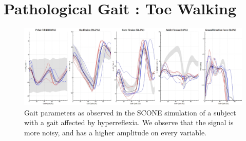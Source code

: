 \documentclass[11pt]{article}
\begin{document}
\section{Pathological Gait : Toe Walking}

\begin{figure}[h!]
    \centering
    \includegraphics[width=\textwidth]{screens/toe_walk_gait.png}
    \caption{Gait parameters as observed in the SCONE simulation of a subject with a gait affected by hyperreflexia. We observe that the signal is more noisy, and has a higher amplitude on every variable. }
    \label{toe_gait}
\end{figure}
\end{document}
